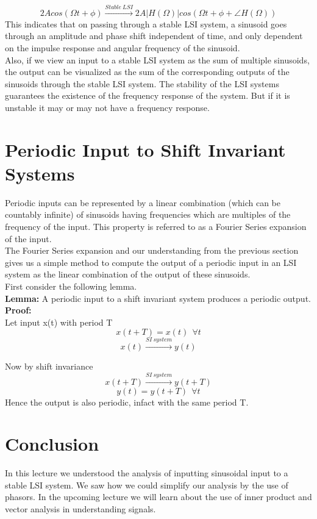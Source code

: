 \[
2Acos(\Omega t + \phi) \xrightarrow{Stable\ LSI} 2A|H(\Omega)|cos(\Omega t + \phi + \angle H(\Omega))
\]
This indicates that on passing through a stable LSI system, a sinusoid goes through an amplitude and phase shift independent of time, and only dependent on the impulse response and angular frequency of the sinusoid.\\
Also, if we view an input to a stable LSI system as the sum of multiple sinusoids, the output can be visualized as the sum of the corresponding outputs of the sinusoids through the stable LSI system. The stability of the LSI systems guarantees the existence of the frequency response of the system. But if it is unstable it may or may not have a frequency response.


\section{Periodic Input to Shift Invariant Systems}
Periodic inputs can be represented by a linear combination (which can be countably infinite) of sinusoids having frequencies which are multiples of the frequency of the input. This property is referred to as a Fourier Series expansion of the input. \\
The Fourier Series expansion and our understanding from the previous section gives us a simple method to compute the output of a periodic input in an LSI system as the linear combination of the output of these sinusoids.\\
First consider the following lemma.\\
\textbf{Lemma:} A periodic input to a shift invariant system produces a periodic output.\\
\textbf{Proof:}\\

Let input x(t) with period T
\[x(t+T) = x(t)\ \ \forall t\]
\[x(t) \xrightarrow{SI\ system} y(t) \]

Now by shift invariance
\[x(t+T) \xrightarrow{SI\ system} y(t+T) \]
\[y(t) = y(t+T)\ \ \forall t \]
Hence the output is also periodic, infact with the same period T.


\section{Conclusion}
In this lecture we understood the analysis of inputting sinusoidal input to a stable LSI system. We saw how we could simplify our analysis by the use of phasors. In the upcoming lecture we will learn about the use of inner product and vector analysis in understanding signals.
